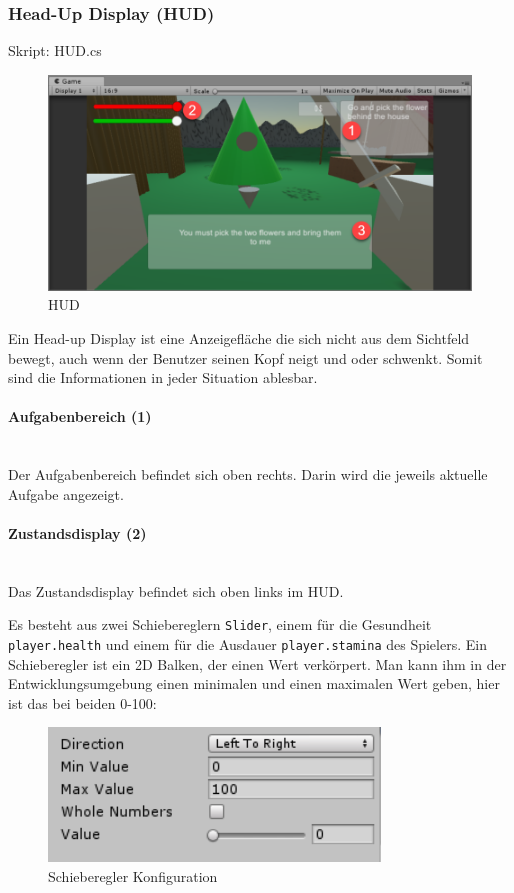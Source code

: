 \subsubsection{Head-Up Display (HUD)}
Skript: HUD.cs\\

\begin{figure}[H]
\includegraphics[scale=0.8]{screenshots/hud.png}
\caption{HUD}
\end{figure}

Ein Head-up Display ist eine Anzeigefläche die sich nicht aus dem Sichtfeld bewegt, auch wenn der Benutzer seinen Kopf neigt und oder schwenkt.
Somit sind die Informationen in jeder Situation ablesbar.
 
\paragraph{Aufgabenbereich (1)}\mbox{} \\
Der Aufgabenbereich befindet sich oben rechts.
Darin wird die jeweils aktuelle Aufgabe angezeigt.

\paragraph{Zustandsdisplay (2)}\mbox{} \\
Das Zustandsdisplay befindet sich oben links im HUD.

Es besteht aus zwei Schiebereglern \lstinline{Slider}, einem für die Gesundheit \lstinline{player.health} und einem für die Ausdauer \lstinline{player.stamina} des Spielers.
Ein Schieberegler ist ein 2D Balken, der einen Wert verkörpert. Man kann ihm in der Entwicklungsumgebung einen minimalen und einen maximalen Wert geben, hier ist das bei beiden 0-100:

\begin{figure}[H]
\includegraphics[scale=1]{screenshots/nullhundert.png}
\caption{Schieberegler Konfiguration}
\end{figure}

